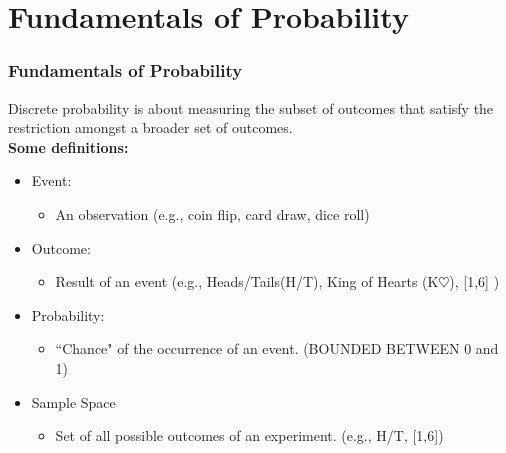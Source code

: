 \documentclass[12pt]{beamer}
\begin{document}
\section{Fundamentals of Probability}
	\begin{frame}
		\frametitle{Fundamentals of Probability}
		Discrete probability is about measuring the subset of outcomes that satisfy the restriction amongst a broader set of outcomes.\\
		\textbf{Some definitions:}
		\begin{itemize}
			\item Event:
			\begin{itemize}
				\item An observation (e.g., coin flip, card draw, dice roll)
			\end{itemize}
			\item Outcome: 
			\begin{itemize}
				\item Result of an event (e.g., Heads/Tails(H/T), King of Hearts (K$\heartsuit$), [1,6] )
			\end{itemize}
			\item Probability:
			\begin{itemize}
				\item ``Chance" of the occurrence of an event. (BOUNDED BETWEEN 0 and 1)
			\end{itemize}
			\item Sample Space
			\begin{itemize}
				\item Set of all possible outcomes of an experiment. (e.g., H/T, [1,6])
			\end{itemize}
		\end{itemize}
	\end{frame}
\end{document}
